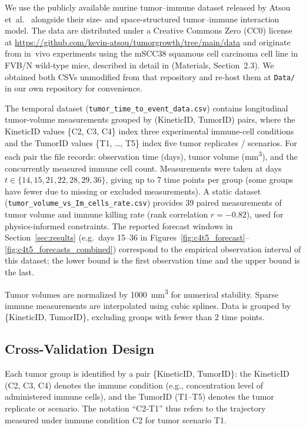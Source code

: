 \documentclass{juliacon}
\begin{document}
We use the publicly available murine tumor--immune dataset released by Atsou et~al.\ \cite{atsou2021size,atsou2022equilibrium} alongside their size- and space-structured tumor--immune interaction model. The data are distributed under a Creative Commons Zero (CC0) license at \url{https://github.com/kevin-atsou/tumorgrowth/tree/main/data} and originate from in~vivo experiments using the mSCC38 squamous cell carcinoma cell line in FVB/N wild-type mice, described in detail in \cite{atsou2022equilibrium} (Materials, Section~2.3). We obtained both CSVs unmodified from that repository and re-host them at \texttt{Data/} in our own repository for convenience.

The temporal dataset (\texttt{tumor\_time\_to\_event\_data.csv}) contains longitudinal tumor-volume measurements grouped by (KineticID, TumorID) pairs, where the KineticID values \{C2, C3, C4\} index three experimental immune-cell conditions and the TumorID values \{T1, \dots, T5\} index five tumor replicates / scenarios. For each pair the file records: observation time (days), tumor volume (mm\textsuperscript{3}), and the concurrently measured immune cell count. Measurements were taken at days $t \in \{14, 15, 21, 22, 28, 29, 36\}$, giving up to 7 time points per group (some groups have fewer due to missing or excluded measurements). A static dataset (\texttt{tumor\_volume\_vs\_Im\_cells\_rate.csv}) provides 39 paired measurements of tumor volume and immune killing rate (rank correlation $r = -0.82$), used for physics-informed constraints. The reported forecast windows in Section~\ref{sec:results} (e.g.\ days 15--36 in Figures~\ref{fig:c4t5_forecast}--\ref{fig:c4t5_forecasts_combined}) correspond to the empirical observation interval of this dataset; the lower bound is the first observation time and the upper bound is the last.

Tumor volumes are normalized by 1000~mm\textsuperscript{3} for numerical stability. Sparse immune measurements are interpolated using cubic splines. Data is grouped by \{KineticID, TumorID\}, excluding groups with fewer than 2 time points.

\subsection{Cross-Validation Design}

Each tumor group is identified by a pair \{KineticID, TumorID\}: the KineticID (C2, C3, C4) denotes the immune condition (e.g., concentration level of administered immune cells), and the TumorID (T1--T5) denotes the tumor replicate or scenario. The notation ``C2-T1'' thus refers to the trajectory measured under immune condition C2 for tumor scenario T1.
\end{document}
